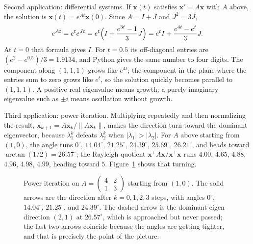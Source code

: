 Second application: differential systems. If $\mathbf{x}(t)$ satisfies
$\mathbf{x}'=A\mathbf{x}$ with $A$ above, the solution is $\mathbf{x}(t)=e^{At}\mathbf{x}(0)$.
Since $A=I+J$ and $J^{2}=3J$,
\[
  e^{At}=e^{t}e^{Jt}=e^{t}\Bigl(I+\frac{e^{3t}-1}{3}J\Bigr)
  =e^{t}I+\frac{e^{4t}-e^{t}}{3}J .
\]
At $t=0$ that formula gives $I$. For $t=0.5$ its off-diagonal entries are
$(e^{2}-e^{0.5})/3=1.9134$, and Python gives the same number to four digits. The component along
$(1,1,1)$ grows like $e^{4t}$; the component in the plane where the entries sum to zero grows like
$e^{t}$, so the solution quickly becomes parallel to $(1,1,1)$. A positive real eigenvalue means
growth; a purely imaginary eigenvalue such as $\pm i$ means oscillation without growth.

Third application: power iteration. Multiplying repeatedly and then normalizing the result,
$\mathbf{x}_{k+1}=A\mathbf{x}_{k}/\lVert A\mathbf{x}_{k}\rVert$, makes the direction turn toward
the dominant eigenvector, because $\lambda_{1}^{k}$ defeats $\lambda_{2}^{k}$ when
$|\lambda_{1}|>|\lambda_{2}|$. For $A$ above starting from $(1,0)$, the angle runs $0^\circ$,
$14.04^\circ$, $21.25^\circ$, $24.39^\circ$, $25.69^\circ$, $26.21^\circ$, and heads toward
$\arctan(1/2)=26.57^\circ$; the Rayleigh quotient $\mathbf{x}^{\top}A\mathbf{x}/\mathbf{x}^{\top}
\mathbf{x}$ runs $4.00$, $4.65$, $4.88$, $4.96$, $4.98$, $4.99$, heading toward $5$.
Figure~\ref{fig:iterasi-pangkat} shows that turning.

\begin{figure}[htbp]
\centering
{}
\caption{Power iteration on $A=\begin{pmatrix}4&2\\1&3\end{pmatrix}$ starting from $(1,0)$. The
solid arrows are the direction after $k=0,1,2,3$ steps, with angles $0^\circ$, $14.04^\circ$,
$21.25^\circ$, and $24.39^\circ$. The dashed arrow is the dominant eigen direction $(2,1)$ at
$26.57^\circ$, which is approached but never passed; the last two arrows coincide because the
angles are getting tighter, and that is precisely the point of the picture.}
\label{fig:iterasi-pangkat}
\end{figure}

